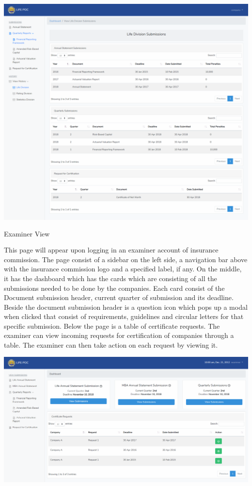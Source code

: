 \documentclass{article}
\begin{document}
\includegraphics[keepaspectratio=true]{up-ic-screens/image99}{}%

\mdhr{}%

\noindent{}Examiner View%

This page will appear upon logging in an examiner
account of insurance commission. The page consist of a sidebar on the
left side, a navigation bar above with the insurance commission logo and
a specified label, if any. On the middle, it has the dashboard which has
the cards which are consisting of all the submissions needed to be done
by the companies. Each card consist of the Document submission header,
current quarter of submission and its deadline. Beside the document
submission header is a question icon which pops up a modal when clicked
that consist of requirements, guidelines and circular letters for that
specific submission. Below the page is a table of certificate requests.
The examiner can view incoming requests for certification of companies
through a table. The examiner can then take action on each request by
viewing it.%

\mdhr{}%

\noindent{}\includegraphics[keepaspectratio=true]{up-ic-screens/image47}{}%
\end{document}

